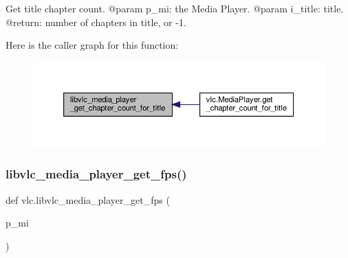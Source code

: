 \begin{DoxyVerb}Get title chapter count.
@param p_mi: the Media Player.
@param i_title: title.
@return: number of chapters in title, or -1.
\end{DoxyVerb}
 Here is the caller graph for this function\+:
\nopagebreak
\begin{figure}[H]
\begin{center}
\leavevmode
\includegraphics[width=350pt]{namespacevlc_a9c238cb76d091ddb073f43ec17c559df_icgraph}
\end{center}
\end{figure}
\mbox{\label{namespacevlc_a29146dbf43a47a18afeb6834dcc3c51b}} 
\subsubsection{\texorpdfstring{libvlc\+\_\+media\+\_\+player\+\_\+get\+\_\+fps()}{libvlc\_media\_player\_get\_fps()}}
{\footnotesize\ttfamily def vlc.\+libvlc\+\_\+media\+\_\+player\+\_\+get\+\_\+fps (\begin{DoxyParamCaption}\item[{}]{p\+\_\+mi }\end{DoxyParamCaption})}

